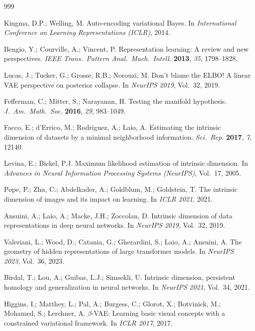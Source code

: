 \documentclass[make,article,submit,pdftex,moreauthors]{Definitions/mdpi}
\begin{document}
\begin{thebibliography}{999}

Kingma, D.P.; Welling, M.
Auto-encoding variational Bayes.
In \textit{International Conference on Learning Representations (ICLR)},
2014.

Bengio, Y.; Courville, A.; Vincent, P.
Representation learning: A review and new perspectives.
\textit{IEEE Trans.\ Pattern Anal.\ Mach.\ Intell.} \textbf{2013},
\textit{35}, 1798--1828.

Lucas, J.; Tucker, G.; Grosse, R.B.; Norouzi, M.
Don't blame the ELBO! A linear VAE perspective on posterior collapse.
In \textit{NeurIPS 2019}, Vol.~32, 2019.

Fefferman, C.; Mitter, S.; Narayanan, H.
Testing the manifold hypothesis.
\textit{J.\ Am.\ Math.\ Soc.} \textbf{2016}, \textit{29}, 983--1049.

Facco, E.; d'Errico, M.; Rodriguez, A.; Laio, A.
Estimating the intrinsic dimension of datasets by a minimal neighborhood
information.
\textit{Sci.\ Rep.} \textbf{2017}, \textit{7}, 12140.

Levina, E.; Bickel, P.J.
Maximum likelihood estimation of intrinsic dimension.
In \textit{Advances in Neural Information Processing Systems (NeurIPS)},
Vol.~17, 2005.

Pope, P.; Zhu, C.; Abdelkader, A.; Goldblum, M.; Goldstein, T.
The intrinsic dimension of images and its impact on learning.
In \textit{ICLR 2021}, 2021.

Ansuini, A.; Laio, A.; Macke, J.H.; Zoccolan, D.
Intrinsic dimension of data representations in deep neural networks.
In \textit{NeurIPS 2019}, Vol.~32, 2019.

Valeriani, L.; Wood, D.; Catania, G.; Gherardini, S.; Laio, A.; Ansuini, A.
The geometry of hidden representations of large transformer models.
In \textit{NeurIPS 2023}, Vol.~36, 2023.

Birdal, T.; Lou, A.; Guibas, L.J.; Simsekli, U.
Intrinsic dimension, persistent homology and generalization in neural
networks.
In \textit{NeurIPS 2021}, Vol.~34, 2021.

Higgins, I.; Matthey, L.; Pal, A.; Burgess, C.; Glorot, X.; Botvinick, M.;
Mohamed, S.; Lerchner, A.
$\beta$-VAE: Learning basic visual concepts with a constrained variational
framework.
In \textit{ICLR 2017}, 2017.


\end{thebibliography}
\end{document}
